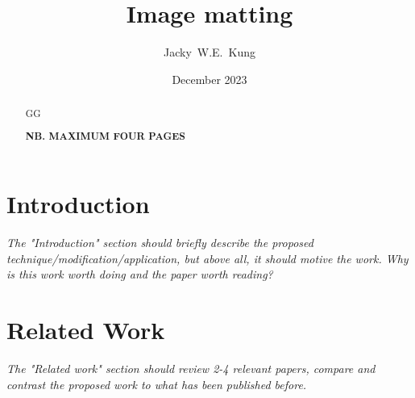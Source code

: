 \documentclass{article}
\title{Image matting}
\author{Jacky~W.E.~Kung}
\date{December 2023}
\begin{document}
\maketitle
\begin{abstract}
    GG

    \textbf{NB. MAXIMUM FOUR PAGES}
\end{abstract}
\begin{multicols}{2}[]




\section{Introduction}
\emph{The "Introduction" section should briefly describe the proposed technique/modification/application, but above all, it should motive the work. Why is this work worth doing and the paper worth reading?}









\section{Related Work}
\emph{The "Related work" section should review 2-4 relevant papers, compare and contrast the proposed work to what has been published before.}



\end{multicols}
\end{document}
